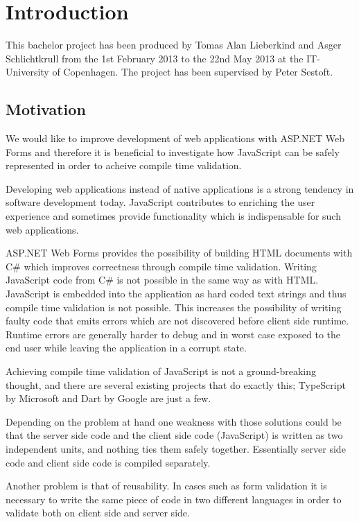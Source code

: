 \chapter{Introduction}
	This bachelor project has been produced by Tomas Alan Lieberkind and Asger Schlichtkrull from the 1st February 2013 to the 22nd May 2013 at the IT-University of Copenhagen. The project has been supervised by Peter Sestoft.

\section{Motivation}
	We would like to improve development of web applications with ASP.NET Web Forms and therefore it is beneficial to investigate how JavaScript can be safely represented in order to acheive compile time validation.

	Developing web applications instead of native applications is a strong tendency in software development today. JavaScript contributes to enriching the user experience and sometimes provide functionality which is indispensable for such web applications.

	ASP.NET Web Forms provides the possibility of building HTML documents with C\# which improves correctness through compile time validation. Writing JavaScript code from C\# is not possible in the same way as with HTML. JavaScript is embedded into the application as hard coded text strings and thus compile time validation is not possible. This increases the possibility of writing faulty code that emits errors which are not discovered before client side runtime. Runtime errors are generally harder to debug and in worst case exposed to the end user while leaving the application in a corrupt state.

	Achieving compile time validation of JavaScript is not a ground-breaking thought, and there are several existing projects that do exactly this; TypeScript by Microsoft and Dart by Google are just a few.

	Depending on the problem at hand one weakness with those solutions could be that the server side code and the client side code (JavaScript) is written as two independent units, and nothing ties them safely together. Essentially server side code and client side code is compiled separately. 

	Another problem is that of reusability. In cases such as form validation it is necessary to write the same piece of code in two different languages in order to validate both on client side and server side.

